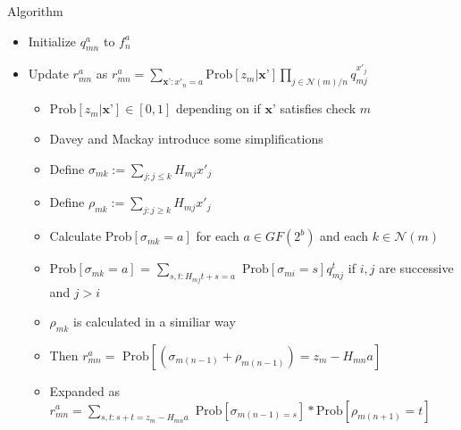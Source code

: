 \documentclass[10pt,ignorenonframetext,]{beamer}
\providecommand{\tightlist}{%
  \setlength{\itemsep}{0pt}\setlength{\parskip}{0pt}}
\begin{document}
\begin{frame}{Algorithm}
\protect\hypertarget{algorithm}{}
\begin{itemize}[<+->]
\tightlist
\item
  Initialize \(q_{mn}^a\) to \(f^a_n\)
\item
  Update \(r_{mn}^a\) as
  \(r_{mn}^a = \sum\limits_{\textbf{x'}:x'_n=a}\text{Prob}[z_m|\textbf{x'}]\prod\limits_{j\in\mathcal{N}(m)/n}q^{x'_j}_{mj}\)

  \begin{itemize}[<+->]
  \tightlist
  \item
    \(\text{Prob}[z_m|\textbf{x'}]\in [0,1]\) depending on if
    \(\textbf{x'}\) satisfies check \(m\)
  \item
    Davey and Mackay introduce some simplifications
  \item
    Define \(\sigma_{mk} := \sum_{j:j\le k} H_{mj}x'_j\)
  \item
    Define \(\rho_{mk} := \sum_{j:j\ge k} H_{mj}x'_j\)
  \item
    Calculate Prob\([\sigma_{mk}=a]\) for each \(a\in GF(2^b)\) and each
    \(k\in \mathcal{N}(m)\)
  \item
    Prob\([\sigma_{mk}=a]\) =
    \(\sum\limits_{s,t:H_{mj}t+s=a}\text{ Prob}[\sigma_{mi}=s]q^t_{mj}\)
    if \(i,j\) are successive and \(j>i\)
  \item
    \(\rho_{mk}\) is calculated in a similiar way
  \item
    Then
    \(r^a_{mn} = \text{ Prob}[(\sigma_{m(n-1)}+\rho_{m(n-1)})=z_m-H_{mn}a]\)
  \item
    Expanded as
    \(r^a_{mn} = \sum\limits_{s,t:s+t=z_m-H_{mn}a}\text{ Prob}[\sigma_{m(n-1)=s}] * \text{Prob}[\rho_{m(n+1)}=t]\)
  \end{itemize}
\end{itemize}
\end{frame}
\end{document}

